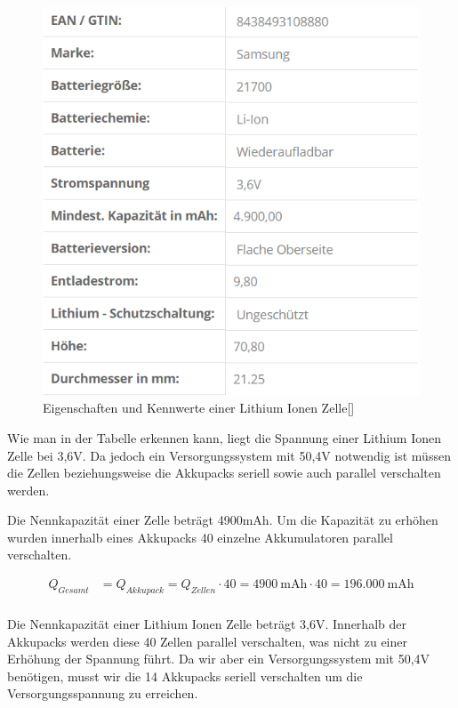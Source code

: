 \begin{figure}[H]
	\begin{center}
		\includegraphics[scale=1.0]{figures/Akku/LithiumIonenZellen.PNG}
		\caption{Eigenschaften und Kennwerte einer Lithium Ionen Zelle[\cite{ZellenEigenschaften}]}
		\label{fig: Eigenschaften und Kennwerte einer Lithium Ionen Zelle}
	\end{center}
\end{figure}

Wie man in der Tabelle erkennen kann, liegt die Spannung einer Lithium Ionen Zelle bei 3,6V. Da jedoch ein Versorgungssystem mit 50,4V notwendig ist müssen die Zellen beziehungsweise die Akkupacks seriell sowie auch parallel verschalten werden. 

Die Nennkapazität einer Zelle beträgt 4900mAh. Um die Kapazität zu erhöhen wurden innerhalb eines Akkupacks 40 einzelne Akkumulatoren parallel verschalten.

\begin{align*}
Q_{Gesamt} &= Q_{Akkupack}= Q_{Zellen} \cdot 40 = 4900~\mathrm{mAh} \cdot 40= 196.000~\mathrm{mAh}\\
\end{align*}

Die Nennkapazität einer Lithium Ionen Zelle beträgt 3,6V. Innerhalb der Akkupacks werden diese 40 Zellen parallel verschalten, was nicht zu einer Erhöhung der Spannung führt. Da wir aber ein Versorgungssystem mit 50,4V benötigen, musst wir die 14 Akkupacks seriell verschalten um die Versorgungsspannung zu erreichen.

